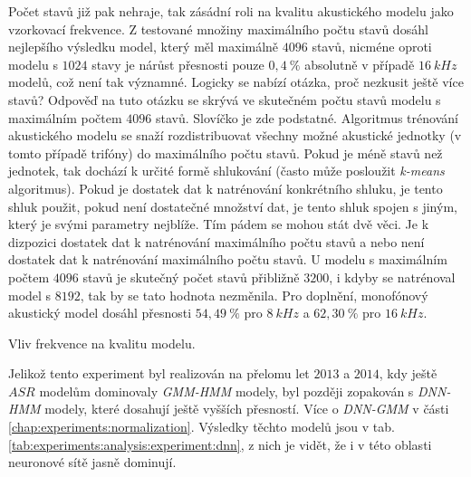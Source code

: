 Počet stavů již pak nehraje, tak zásádní roli na kvalitu akustického modelu jako vzorkovací frekvence. Z testované množiny maximálního počtu stavů dosáhl nejlepšího výsledku model, který měl maximálně $4096$ stavů, nicméne oproti modelu s $1024$ stavy je nárůst přesnosti pouze $0,4\ \%$ absolutně v případě $16\ kHz$ modelů, což není tak významné. Logicky se nabízí otázka, proč nezkusit ještě více stavů? Odpověď na tuto otázku se skrývá ve skutečném počtu stavů modelu s maximálním počtem $4096$ stavů. Slovíčko  je zde podstatné. Algoritmus trénování akustického modelu se snaží rozdistribuovat všechny možné akustické jednotky (v tomto případě trifóny) do maximálního počtu stavů. Pokud je méně stavů než jednotek, tak dochází k určité formě shlukování (často může posloužit \textit{k-means} algoritmus). Pokud je dostatek dat k natrénování konkrétního shluku, je tento shluk použit, pokud není dostatečné množství dat, je tento shluk spojen s jiným, který je svými parametry nejblíže. Tím pádem se mohou stát dvě věci. Je k dizpozici dostatek dat k natrénování maximálního počtu stavů a nebo není dostatek dat k natrénování maximálního počtu stavů. U modelu s maximálním počtem $4096$ stavů je skutečný počet stavů přibližně $3200$, i kdyby se natrénoval model s $8192$, tak by se tato hodnota nezměnila. Pro doplnění, monofónový akustický model dosáhl přesnosti $54,49\ \%$ pro $8\ kHz$ a $62,30\ \%$ pro $16\ kHz$.

\begin{table}[htpb]
  \centering
  \def\arraystretch{1.5}
  \caption{Vliv frekvence na kvalitu modelu.}
  \label{tab:experiments:analysis:experiment:gmm}
\end{table}

Jelikož tento experiment byl realizován na přelomu let $2013$ a $2014$, kdy ještě $ASR$ modelům dominovaly \textit{GMM-HMM} modely, byl později zopakován s \textit{DNN-HMM} modely, které dosahují ještě vyšších přesností. Více o \textit{DNN-GMM} v části \ref{chap:experiments:normalization}. Výsledky těchto modelů jsou v tab. \ref{tab:experiments:analysis:experiment:dnn}, z nich je vidět, že i v této oblasti neuronové sítě jasně dominují.


